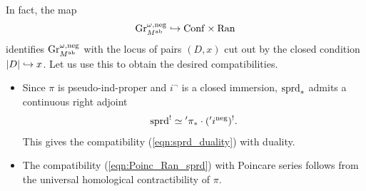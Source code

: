 \subsubsection{} 
\label{subsection:sprd_compatibilities}
In fact, the map
    \[\mathrm{Gr}_{M^{\mathrm{ab}}}^{\omega,\mathrm{neg}} \hookrightarrow \mathrm{Conf} \times \mathrm{Ran}\]
identifies $\mathrm{Gr}_{M^{\mathrm{ab}}}^{\omega,\mathrm{neg}}$ with the locus of pairs $(D, x)$ cut out by the closed condition $|D| \hookrightarrow x$. Let us use this to obtain the desired compatibilities.
\begin{itemize}
    \item Since $\pi$ is pseudo-ind-proper and $i^\neg$ is a closed immersion, $\mathrm{sprd}_*$ admits a continuous right adjoint
        \[\mathrm{sprd}^! \simeq {'}\pi_* \cdot ({'} i^{\mathrm{neg}})^!.\]
    This gives the compatibility (\ref{eqn:sprd_duality}) with duality.
    \item The compatibility (\ref{eqn:Poinc_Ran_sprd}) with Poincare series follows from the universal homological contractibility of $\pi$.
\end{itemize}